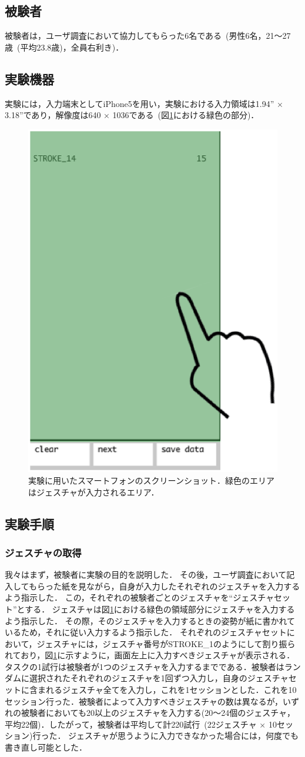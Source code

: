 \subsection{被験者}
被験者は，ユーザ調査において協力してもらった6名である~(男性6名，21〜27歳~(平均23.8歳)，全員右利き)．

\subsection{実験機器}
実験には，入力端末としてiPhone5を用い，実験における入力領域は1.94'' × 3.18''であり，解像度は640 × 1036である~(図\ref{fig:screenshot}における緑色の部分)．

\begin{figure}[!h]
\centering
\includegraphics[width=0.4\columnwidth]{img/screenshot.eps}
\caption{実験に用いたスマートフォンのスクリーンショット．緑色のエリアはジェスチャが入力されるエリア．}
\label{fig:screenshot}
\end{figure}


\subsection{実験手順}
\subsubsection{ジェスチャの取得}
我々はまず，被験者に実験の目的を説明した．
その後，ユーザ調査において記入してもらった紙を見ながら，自身が入力したそれぞれのジェスチャを入力するよう指示した．
この，それぞれの被験者ごとのジェスチャを``ジェスチャセット''とする．
ジェスチャは図\ref{fig:screenshot}における緑色の領域部分にジェスチャを入力するよう指示した．
その際，そのジェスチャを入力するときの姿勢が紙に書かれているため，それに従い入力するよう指示した．
それぞれのジェスチャセットにおいて，ジェスチャには，ジェスチャ番号がSTROKE\_1のようにして割り振られており，図\ref{fig:screenshot}に示すように，画面左上に入力すべきジェスチャが表示される．
タスクの1試行は被験者が1つのジェスチャを入力するまでである．被験者はランダムに選択されたそれぞれのジェスチャを1回ずつ入力し，自身のジェスチャセットに含まれるジェスチャ全てを入力し，これを1セッションとした．これを10セッション行った．被験者によって入力すべきジェスチャの数は異なるが，いずれの被験者においても20以上のジェスチャを入力する(20〜24個のジェスチャ，平均22個)．したがって，被験者は平均して計220試行~(22ジェスチャ $\times$ 10セッション)行った．
ジェスチャが思うように入力できなかった場合には，何度でも書き直し可能とした．

